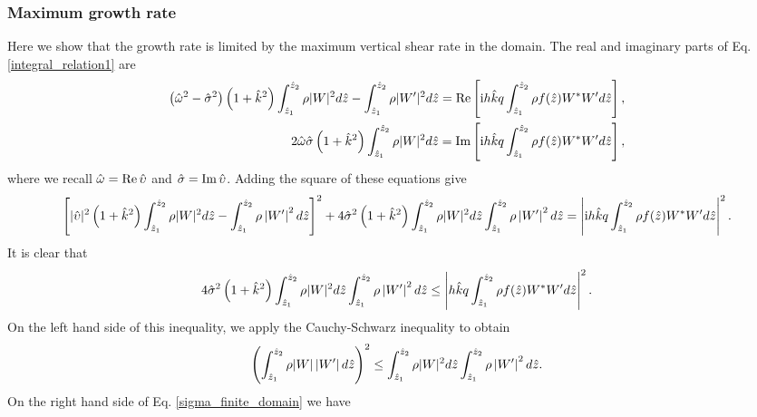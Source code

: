 \subsubsection{Maximum growth rate}\label{max_growth1}
Here we show that the growth rate is limited by the maximum vertical
shear rate in the domain. %
The real and imaginary parts of 
Eq. \ref{integral_relation1} are
\begin{align}
  \left(\hat{\omega}^2-\hat{\sigma}^2\right)\left(1+\hat{k}^2\right) 
  \int_{\hat{z}_1}^{\hat{z}_2}\rho|W|^2d\hat{z} -
  \int_{\hat{z}_1}^{\hat{z}_2}\rho|W^\prime|^2d\hat{z}
  \notag
  =\operatorname{Re}\left[\mathrm{i}
    h\hat{k}q \int_{\hat{z}_1}^{\hat{z}_2}\rho
    f(\hat{z}) W^*W^\prime d\hat{z}\right], \\
   2\hat{\omega}\hat{\sigma}\left(1+\hat{k}^2\right)
  \int_{\hat{z}_1}^{\hat{z}_2}\rho|W|^2d\hat{z}
  =\operatorname{Im}\left[\mathrm{i}
    h\hat{k}q \int_{\hat{z}_1}^{\hat{z}_2}\rho
    f(\hat{z}) W^*W^\prime d\hat{z}\right],
\end{align}
where we recall $\hat{\omega} = \operatorname{Re} \hat{\upsilon}$ and
$\hat{\sigma}=\operatorname{Im}\hat{\upsilon}$. 
Adding the square of these equations give
\begin{align}
  \left[|\hat{\upsilon}|^2\left(1+\hat{k}^2\right)
    \int_{\hat{z}_1}^{\hat{z}_2}\rho|W|^2d\hat{z} -
    \int_{\hat{z}_1}^{\hat{z}_2}\rho\left|W^\prime \right|^2d\hat{z}\right]^2
  +4\hat{\sigma}^2\left(1+\hat{k}^2\right) 
  \int_{\hat{z}_1}^{\hat{z}_2}\rho
  |W|^2d\hat{z}\int_{\hat{z}_1}^{\hat{z}_2}\rho\left|W^\prime \right|^2d\hat{z}
  =\left|\mathrm{i}
    h\hat{k}q\int_{\hat{z}_1}^{\hat{z}_2}\rho
    f(\hat{z}) W^*W^\prime d\hat{z}\right|^2.
\end{align}
It is clear that
\begin{align}\label{sigma_finite_domain} 
  4\hat{\sigma}^2\left(1+\hat{k}^2\right) 
  \int_{\hat{z}_1}^{\hat{z}_2}\rho
  |W|^2d\hat{z}\int_{\hat{z}_1}^{\hat{z}_2}\rho\left|W^\prime
  \right|^2d\hat{z} 
  \leq\left|
    h\hat{k}q\int_{\hat{z}_1}^{\hat{z}_2}\rho
    f(\hat{z}) W^*W^\prime d\hat{z}\right|^2.
\end{align}
On the left hand side of this inequality, we apply the Cauchy-Schwarz
inequality to obtain
\begin{align}
  \left( \int_{\hat{z}_1}^{\hat{z}_2}\rho
    |W|\left|W^\prime \right|d\hat{z}\right)^2\leq
  \int_{\hat{z}_1}^{\hat{z}_2}\rho 
  |W|^2d\hat{z}\int_{\hat{z}_1}^{\hat{z}_2}\rho\left|W^\prime \right|^2d\hat{z}.
\end{align}
On the right hand side of Eq. \ref{sigma_finite_domain} we have
